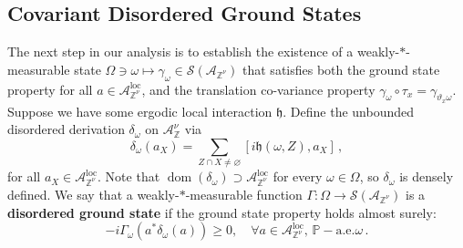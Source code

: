 \documentclass{article}
\DeclareMathOperator{\dom}{dom}
\newcommand{\Znu}{\mathbb{Z}^\nu}
\newcommand{\A}{\mathcal{A}}
\renewcommand{\P}{\mathbb{P}}
\DeclareMathOperator{\loc}{loc}
\newcommand{\aloc}{\mathcal{A}_{\mathbb{Z}^\nu}^{\loc}}
\newcommand{\<}{\langle}
\renewcommand{\>}{\rangle}
\let\emptyset\varnothing
\newcommand{\h}{\mathfrak{h}}
\theoremstyle{definition}
\numberwithin{equation}{section}
\begin{document}
\subsection{Covariant Disordered Ground States}
The next step in our analysis is to establish the existence of a weakly-$\ast$-measurable state $\Omega \ni \omega \mapsto \gamma_\omega \in \mathcal{S}(\A_{\Znu})$ that satisfies both the ground state property for all $a\in \aloc$, and the translation co-variance property $\gamma_\omega \circ \tau_{x} = \gamma_{\vartheta_x \omega}$.
Suppose we have some ergodic local interaction $\h$. Define the unbounded disordered derivation $\delta_\omega$ on $\A_\Znu$ via 
\begin{equation}\label{def:unbounded_derivation}
	\delta_\omega(a_X) = \sum_{Z\cap X \neq \emptyset} [i\h(\omega,Z), a_X]\,,
\end{equation} for all $a_X\in \aloc$. Note that $\dom(\delta_\omega) \supset \aloc$ for every $\omega \in \Omega$, so $\delta_\omega$ is densely defined. We say that a weakly-$\ast$-measurable function $\Gamma: \Omega \to \mathcal{S}(\A_{\Znu})$ is a \textbf{disordered ground state} if the ground state property holds almost surely:
\begin{equation}\label{eqn:C_star_ground_state}
	-i\Gamma_\omega(a^*\delta_\omega(a)) \ge 0, \quad \forall a\in \aloc,\, \P-\mathrm{a.e. } \omega\,.
\end{equation}
\end{document}
